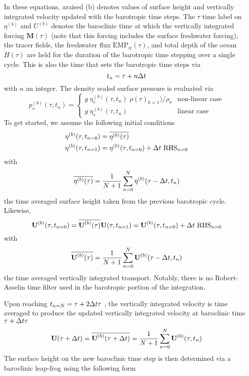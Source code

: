\documentclass[../main/NEMO_manual]{subfiles}
\begin{document}
{In these equations, araised (b) denotes values of surface height and vertically integrated velocity updated with
the barotropic time steps.
The $\tau$ time label on $\eta^{(b)}$ and $U^{(b)}$ denotes the baroclinic time at which
the vertically integrated forcing $\textbf{M}(\tau)$
(note that this forcing includes the surface freshwater forcing),
the tracer fields, the freshwater flux $\text{EMP}_w(\tau)$,
and total depth of the ocean $H(\tau)$ are held for the duration of the barotropic time stepping over
a single cycle.
This is also the time that sets the barotropic time steps via 
\[
  t_n=\tau+n\Delta t
\]
with $n$ an integer.
The density scaled surface pressure is evaluated via 
\[
  p_s^{(b)}(\tau,t_{n}) =
  \begin{cases}
    g \;\eta_s^{(b)}(\tau,t_{n}) \;\rho(\tau)_{k=1}) / \rho_o  &      \text{non-linear case} \\
    g \;\eta_s^{(b)}(\tau,t_{n})  &      \text{linear case}
  \end{cases}
\]
To get started, we assume the following initial conditions 
\[
  \begin{split}
    \eta^{(b)}(\tau,t_{n=0}) &= \overline{\eta^{(b)}(\tau)}    \\
    \eta^{(b)}(\tau,t_{n=1}) &= \eta^{(b)}(\tau,t_{n=0}) + \Delta t \ \text{RHS}_{n=0}
  \end{split}
\]
with 
\[
  \overline{\eta^{(b)}(\tau)} = \frac{1}{N+1} \sum\limits_{n=0}^N \eta^{(b)}(\tau-\Delta t,t_{n})
\]
the time averaged surface height taken from the previous barotropic cycle.
Likewise, 
\[
  \textbf{U}^{(b)}(\tau,t_{n=0}) = \overline{\textbf{U}^{(b)}(\tau)}	\\ \\
  \textbf{U}(\tau,t_{n=1}) = \textbf{U}^{(b)}(\tau,t_{n=0}) + \Delta t \ \text{RHS}_{n=0}
\]
with 
\[
  \overline{\textbf{U}^{(b)}(\tau)} = \frac{1}{N+1} \sum\limits_{n=0}^N\textbf{U}^{(b)}(\tau-\Delta t,t_{n})
\]
the time averaged vertically integrated transport.
Notably, there is no Robert-Asselin time filter used in the barotropic portion of the integration. 

Upon reaching $t_{n=N} = \tau + 2\Delta t \tau$ ,
the vertically integrated velocity is time averaged to produce the updated vertically integrated velocity at
baroclinic time $\tau + \Delta t \tau$ 
\[
  \textbf{U}(\tau+\Delta t) = \overline{\textbf{U}^{(b)}(\tau+\Delta t)} = \frac{1}{N+1} \sum\limits_{n=0}^N\textbf{U}^{(b)}(\tau,t_{n})
\]
The surface height on the new baroclinic time step is then determined via a baroclinic leap-frog using
the following form 

}
\end{document}
